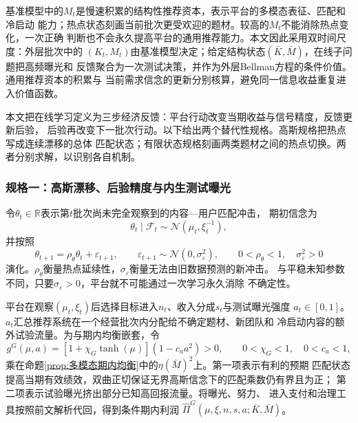 \documentclass[UTF8, a4paper, 12pt, fontset=fandol]{ctexart}
\theoremstyle{definition}
\theoremstyle{remark}
\begin{document}
基准模型中的$M_t$是慢速积累的结构性推荐资本，表示平台的多模态表征、匹配和冷启动
能力；热点状态刻画当前批次更受欢迎的题材。较高的$M_t$不能消除热点变化，一次正确
判断也不会永久提高平台的通用推荐能力。本文因此采用双时间尺度：外层批次中的
$(K_t,M_t)$由基准模型决定；给定结构状态$(\bar K,\bar M)$，在线子问题把高频曝光和
反馈聚合为一次测试决策，并作为外层Bellman方程的条件价值。通用推荐资本的积累与
当前需求信念的更新分别核算，避免同一信息收益重复进入价值函数。

本文把在线学习定义为三步经济反馈：平台行动改变当期收益与信号精度，反馈更新后验，
后验再改变下一批次行动。以下给出两个替代性规格。高斯规格把热点写成连续漂移的总体
匹配状态；有限状态规格刻画两类题材之间的热点切换。两者分别求解，以识别各自机制。

\subsubsection{规格一：高斯漂移、后验精度与内生测试曝光}

令$\theta_t\in\mathbb R$表示第$t$批次尚未完全观察到的内容---用户匹配冲击，
期初信念为
\begin{equation}
  \theta_t\mid\mathcal F_t
  \sim\mathcal N\!\left(\mu_t,\xi_t^{-1}\right),
  \label{eq:匹配状态后验}
\end{equation}
并按照
\begin{equation}
  \theta_{t+1}=\rho_\theta\theta_t+\varepsilon_{t+1},
  \qquad
  \varepsilon_{t+1}\sim\mathcal N(0,\sigma_\varepsilon^2),
  \qquad 0<\rho_\theta<1,\quad \sigma_\varepsilon^2>0
  \label{eq:潜在匹配状态转移}
\end{equation}
演化。$\rho_\theta$衡量热点延续性，$\sigma_\varepsilon$衡量无法由旧数据预测的新冲击。
与平稳未知参数不同，只要$\sigma_\varepsilon>0$，平台就不可能通过一次学习永久消除
不确定性。

平台在观察$(\mu_t,\xi_t)$后选择目标进入$n_t$、收入分成$s_t$与测试曝光强度
$a_t\in[0,1]$。$a_t$汇总推荐系统在一个经营批次内分配给不确定题材、新团队和
冷启动内容的额外试验流量。为与期内均衡嵌套，令
\begin{equation}
  g^G(\mu,a)=[1+\chi_G\tanh(\mu)](1-c_a a^2)>0,
  \qquad 0<\chi_G<1,\quad 0<c_a<1,
  \label{eq:高斯当期匹配乘数}
\end{equation}
乘在命题\ref{prop:多模态期内均衡}中的$\eta(\bar M)^2$上。第一项表示有利的预期
匹配状态提高当期有效绩效，双曲正切保证无界高斯信念下的匹配乘数仍有界且为正；
第二项表示试验曝光挤出部分已知高回报流量。将曝光、努力、
进入支付和治理工具按照前文解析代回，得到条件期内利润
$\widehat\Pi^G(\mu,\xi,n,s,a;\bar K,\bar M)$。
\end{document}
